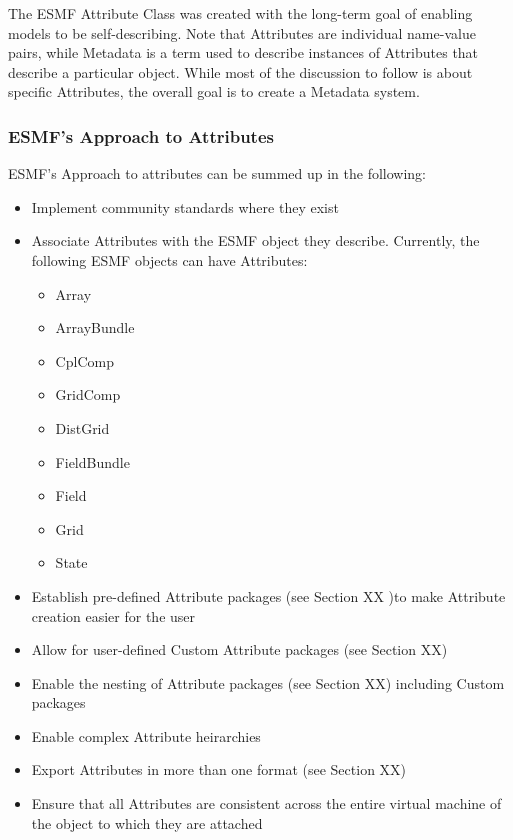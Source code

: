 %


The ESMF Attribute Class was created with the long-term goal of enabling models to be self-describing. Note that Attributes are individual name-value pairs, while Metadata is a term used to describe instances of Attributes that describe a particular object. While most of the discussion to follow is about specific Attributes, the overall goal is to create a Metadata system.   

\subsubsection{ESMF's Approach to Attributes}

ESMF's Approach to attributes can be summed up in the following:

\begin{itemize}
  \item Implement community standards where they exist
  \item Associate Attributes with the ESMF object they describe. Currently, the following ESMF objects can have Attributes:
  \begin{itemize}
     \item Array
     \item ArrayBundle
     \item CplComp
     \item GridComp
     \item DistGrid
     \item FieldBundle
     \item Field
     \item Grid
     \item State
     \end{itemize}
  \item Establish pre-defined Attribute packages (see Section XX )to make Attribute creation easier for the user
  \item Allow for user-defined Custom Attribute packages (see Section XX)
  \item Enable the nesting of Attribute packages (see Section XX) including Custom packages
  \item Enable complex Attribute heirarchies
  \item Export Attributes in more than one format (see Section XX)
  \item Ensure that all Attributes are consistent across the entire virtual machine of the object to which they are attached  
\end{itemize}


